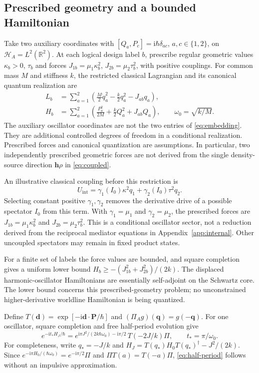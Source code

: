 \documentclass[aip,adv,reprint,onecolumn,amsmath,amssymb]{revtex4-2}
\newcommand{\R}{\mathbb R}
\newcommand{\ii}{\mathrm i}
\begin{document}
\subsection{Prescribed geometry and a bounded Hamiltonian}
Take two auxiliary coordinates with $[Q_a,P_c]=\ii\hbar\delta_{ac}$, $a,c\in\{1,2\}$, on $\mathcal H_A=L^2(\R^2)$. At each logical design label $b$, prescribe regular geometric values $\kappa_b>0$, $\tau_b$ and forces $J_{1b}=\mu_1\kappa_b^2$, $J_{2b}=\mu_2\tau_b^2$, with positive couplings. For common mass $M$ and stiffness $k$, the restricted classical Lagrangian and its canonical quantum realization are
\begin{align}
 L_b&=\sum_{a=1}^2\left(\frac M2\dot q_a^2-\frac k2q_a^2-J_{ab}q_a\right),\\
 H_b&=\sum_{a=1}^2\left(\frac{P_a^2}{2M}+\frac k2Q_a^2+J_{ab}Q_a\right),\qquad\omega_0=\sqrt{k/M}.
 \label{eq:oscillators}
\end{align}
The auxiliary oscillator coordinates are not the two entries of \eqref{eq:embedding}. They are additional controlled degrees of freedom in a conditional realization. Prescribed forces and canonical quantization are assumptions. In particular, two independently prescribed geometric forces are not derived from the single density-source direction $\bm h\rho$ in \eqref{eq:coupled}.


An illustrative classical coupling before this restriction is
\begin{equation}
 U_{\mathrm{int}}=\gamma_1(I_0)\kappa^2q_1+\gamma_2(I_0)\tau^2q_2.
 \label{eq:prescribed-source-coupling}
\end{equation}
Selecting constant positive $\gamma_1,\gamma_2$ removes the derivative drive of a possible spectator $I_0$ from this term. With $\gamma_1=\mu_1$ and $\gamma_2=\mu_2$, the prescribed forces are $J_{1b}=\mu_1\kappa_b^2$ and $J_{2b}=\mu_2\tau_b^2$. This is a conditional oscillator sector, not a reduction derived from the reciprocal mediator equations in Appendix~\ref{app:internal}. Other uncoupled spectators may remain in fixed product states.

For a finite set of labels the force values are bounded, and square completion gives a uniform lower bound $H_b\ge-(J_{1b}^2+J_{2b}^2)/(2k)$. The displaced harmonic-oscillator Hamiltonians are essentially self-adjoint on the Schwartz core. The lower bound concerns this prescribed-geometry problem; no unconstrained higher-derivative worldline Hamiltonian is being quantized.

Define $T(\bm d)=\exp[-\ii\bm d\cdot\bm P/\hbar]$ and $(\Pi_Ag)(\bm q)=g(-\bm q)$. For one oscillator, square completion and free half-period evolution give
\begin{equation}
 e^{-\ii t_*H_J/\hbar}=e^{\ii\pi J^2/(2k\hbar\omega_0)-\ii\pi/2}\,T(-2J/k)\Pi,
 \qquad t_*=\pi/\omega_0.
 \label{eq:half-period}
\end{equation}
For completeness, write $q_*=-J/k$ and $H_J=T(q_*)H_0T(q_*)^\dagger-J^2/(2k)$. Since $e^{-\ii\pi H_0/(\hbar\omega_0)}=e^{-\ii\pi/2}\Pi$ and $\Pi T(a)=T(-a)\Pi$, \eqref{eq:half-period} follows without an impulsive approximation.
\end{document}
